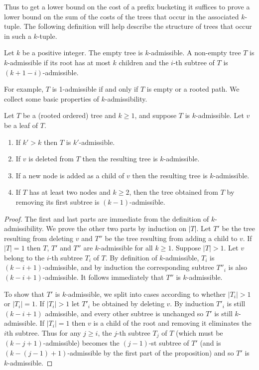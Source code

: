 \documentclass[unicode,review]{siamart1116}
\numberwithin{theorem}{section}
\begin{document}
Thus to get a lower bound on the cost of a prefix bucketing 
it suffices to prove a lower bound on the sum of the costs of
the trees that occur in the associated $k$-tuple. 
The following definition will help describe the structure of
trees that occur in such a $k$-tuple.
 
\begin{definition}[$k$-admissible]
\label{def:k-admissibility}
Let $k$ be a positive integer. 
The empty tree is $k$-admissible. A non-empty tree $T$ is $k$-admissible if its root has at most $k$ children
and the $i$-th  subtree of $T$ is $(k+1-i)$-admissible.
\end{definition}

For example, $T$ is 1-admissible if and only if $T$ is empty or a rooted path.
We collect some basic properties of $k$-admissibility.

\begin{proposition}
\label{lm:k-admissibility}
Let $T$ be a (rooted ordered) tree and $k \geq 1$, and suppose $T$ is $k$-admissible. Let $v$ be a leaf of $T$.
\begin{enumerate}
\item If  $k' > k$ then $T$ is $k'$-admissible.
\item If $v$ is deleted from $T$ then the resulting tree  is  $k$-admissible. 
\item If a new node is added as a child of $v$  then the resulting tree is $k$-admissible.
\item  If $T$ has at least two nodes and $k \geq 2$, 
then the tree obtained from $T$ by removing its first subtree is $(k-1)$-admissible.
\end{enumerate}
\end{proposition}
\begin{proof}
The first and last parts are  immediate from the definition of $k$-admissibility.
We prove the other two parts by induction on $|T|$. 
 Let $T'$ be the tree resulting from deleting $v$
and $T''$ be the tree resulting from adding a child to $v$.  If $|T|=1$ then  $T$, $T'$ and $T''$
are $k$-admissible for all $k \geq 1$.
Suppose $|T| > 1$.  Let $v$ belong to the $i$-th subtree $T_i$ of $T$.
By definition of $k$-admissible, $T_i$ is $(k-i+1)$-admissible, and by induction the corresponding
subtree $T''_i$ is also $(k-i+1)$-admissible.  It follows immediately that $T''$ is $k$-admissible.

To show that $T'$ is $k$-admissible, we split into cases according to whether $|T_i|>1$ or $|T_i|=1$.
If $|T_i|>1$ let $T'_i$ be obtained by deleting $v$.   By induction $T'_i$ is still $(k-i+1)$ admissible,
and every other subtree is unchanged so $T'$ is still $k$-admissible.  
If $|T_i|=1$ then $v$ is a child of the root and removing it eliminates the $i$th subtree. Thus for any $j \geq i$, 
the $j$-th subtree $T_j$
of $T$ (which must be $(k-j+1)$-admissible) becomes the $(j-1)$-st subtree of $T'$ (and is $(k-(j-1)+1)$-admissible 
by the first part of the proposition) and so $T'$ is $k$-admissible. 
\end{proof}
\end{document}
